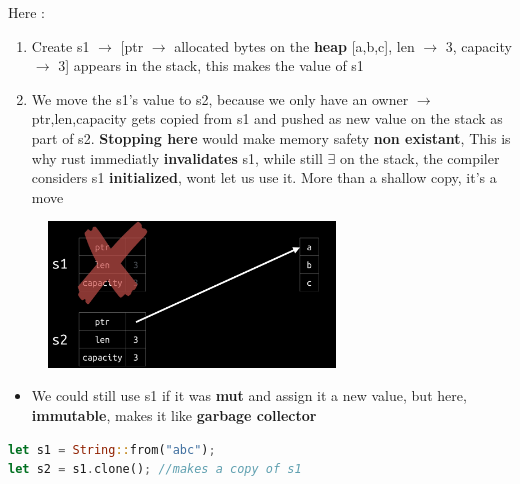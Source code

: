 \documentclass{report}
\begin{document}
\begin{multicols*}{2}
  Here :
\begin{enumerate}
  \item Create s1 $\rightarrow$ [ptr $\rightarrow$ allocated bytes on the \textbf{heap} [a,b,c], len $\rightarrow$ 3, capacity $\rightarrow$ 3] appears in the stack, this makes the value of s1 
  \item We move the s1's value to s2, because we only have an owner $\rightarrow$ ptr,len,capacity gets copied from s1 and pushed as new value on the stack as part of s2. \textbf{Stopping here} would
    make memory safety \textbf{non existant}, This is why rust immediatly \textbf{invalidates} s1, while still $\exists $ on the stack, the compiler considers s1 \textbf{initialized}, wont let us use it.
    More than a shallow copy, it's a move
\end{enumerate}


\begin{figure}[H] 
	 \centering 
	 \includegraphics[width=3in]{screenshots/2022-07-16T19-12-15Z.png} 
 \end{figure}

\begin{itemize}
  \item We could still use s1 if it was \textbf{mut} and assign it a new value,
    but here, \textbf{immutable}, makes it like \textbf{garbage collector} 
\end{itemize}

\begin{tcolorbox}[title=If we don't to move but to copy the value,colback=backcolour,size=small,left=4mm]
\begin{lstlisting}[language=rust]
let s1 = String::from("abc");
let s2 = s1.clone(); //makes a copy of s1
\end{lstlisting}
\end{tcolorbox}


\end{multicols*}
\end{document}
